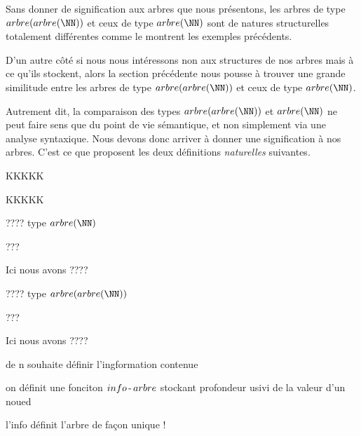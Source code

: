 Sans donner de signification aux arbres que nous présentons, les arbres de type $arbre(arbre(\NN))$ et ceux de type $arbre(\NN)$ sont de natures structurelles totalement différentes comme le montrent les exemples précédents.


\medskip

D'un autre côté si nous nous intéressons non aux structures de nos arbres mais à ce qu'ils stockent, alors la section précédente nous pousse à trouver une grande similitude entre les arbres de type $arbre(arbre(\NN))$ et ceux de type $arbre(\NN)$. 


\medskip

Autrement dit, la comparaison des types $arbre(arbre(\NN))$ et $arbre(\NN)$ ne peut faire sens que du point de vie sémantique, et non simplement via une analyse syntaxique.
Nous devons donc arriver à donner une signification à nos arbres. C'est ce que proposent les deux définitions \emph{\og naturelles \fg} suivantes.


\begin{definition}
	KKKKK
\end{definition}



\begin{definition}
	KKKKK
\end{definition}



\begin{example}
	????    
	type $arbre(\NN)$
	\begin{pseudocode}
???
	\end{pseudocode}
	
	\medskip
	
	Ici nous avons ????
\end{example}



\begin{example}
	????    
	type $arbre(arbre(\NN))$
	\begin{pseudocode}
???
	\end{pseudocode}
	
	\medskip
	
	Ici nous avons ????
\end{example}



 de n souhaite définir l'ingformation contenue

on définit une fonciton $info\,\text{-}\,arbre$ stockant profondeur usivi de la valeur d'un noued

l'info définit l'arbre de façon unique !

